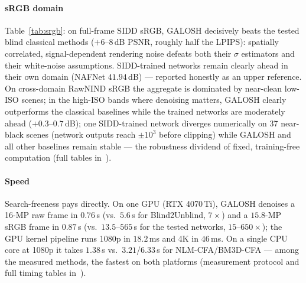 \documentclass[journal]{IEEEtran}
\begin{document}
\paragraph{sRGB domain} Table~\ref{tab:srgb}: on full-frame SIDD sRGB, GALOSH
decisively beats the tested blind classical methods ($+6$--$8$\,dB PSNR,
roughly half the LPIPS): spatially correlated, signal-dependent rendering
noise defeats both their $\sigma$ estimators and their white-noise
assumptions. SIDD-trained networks remain clearly ahead in their own domain
(NAFNet $41.94$\,dB) --- reported honestly as an upper reference. On
cross-domain RawNIND sRGB the aggregate is dominated by near-clean low-ISO
scenes; in the high-ISO bands where denoising matters, GALOSH clearly
outperforms the classical baselines while the trained networks are moderately
ahead ($+0.3$--$0.7$\,dB); one SIDD-trained network diverges numerically on
37 near-black scenes (network outputs reach $\pm10^3$ before clipping) while
GALOSH and all other baselines remain stable --- the robustness dividend of
fixed, training-free computation (full tables in~\cite{galosharxiv}).

\paragraph{Speed} Search-freeness pays directly. On one GPU (RTX 4070\,Ti),
GALOSH denoises a 16-MP raw frame in $0.76$\,s (vs.\ $5.6$\,s for
Blind2Unblind, $7\times$) and a $15.8$-MP sRGB frame in $0.87$\,s (vs.\
$13.5$--$565$\,s for the tested networks, $15$--$650\times$); the GPU kernel
pipeline runs 1080p in $18.2$\,ms and 4K in $46$\,ms. On a single CPU core at
1080p it takes $1.38$\,s vs.\ $3.21$/$6.33$\,s for NLM-CFA/BM3D-CFA --- among
the measured methods, the fastest on both platforms
(measurement protocol and full timing tables in~\cite{galosharxiv}).
\end{document}
